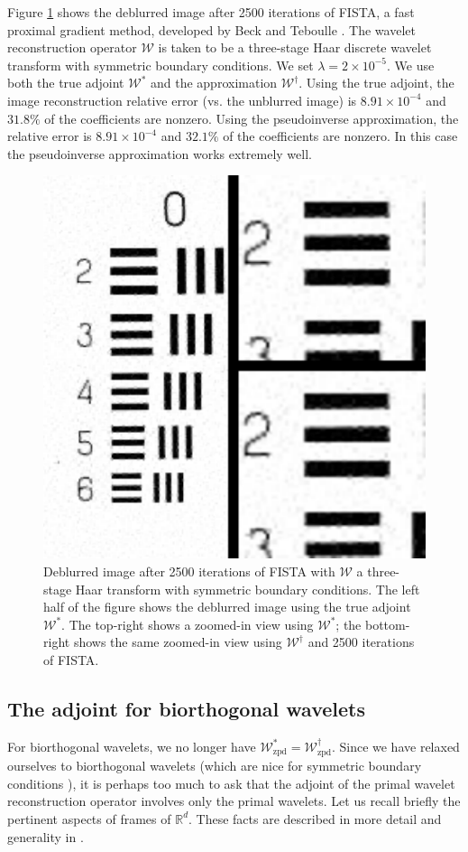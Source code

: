 \documentclass[journal]{IEEEtran}
\newcommand{\reals}{\mathbb{R}}
\begin{document}
Figure \ref{fig:compare_db1_sym} shows the deblurred image after 2500 iterations of FISTA, a fast proximal gradient method, developed by Beck and Teboulle \cite{beck_2009}.  The wavelet reconstruction operator $\mathcal{W}$ is taken to be a three-stage Haar discrete wavelet transform with symmetric boundary conditions.  We set $\lambda=2\times 10^{-5}$.  We use both the true adjoint $\mathcal{W}^\ast$ and the approximation $\mathcal{W}^\dagger$.  Using the true adjoint, the image reconstruction relative error (vs. the unblurred image) is $8.91\times10^{-4}$ and $31.8\%$ of the coefficients are nonzero.  Using the pseudoinverse approximation, the relative error is $8.91\times 10^{-4}$ and $32.1\%$ of the coefficients are nonzero.  In this case the pseudoinverse approximation works extremely well.

\begin{figure}
   \centering
   \includegraphics[width=0.8\columnwidth]{fig2.pdf}
   \caption{Deblurred image after 2500 iterations of FISTA with $\mathcal{W}$ a three-stage Haar transform with symmetric boundary conditions.  The left half of the figure shows the deblurred image using the true adjoint $\mathcal{W}^\ast$.  The top-right shows a zoomed-in view using $\mathcal{W}^\ast$; the bottom-right shows the same zoomed-in view using $\mathcal{W}^\dagger$ and 2500 iterations of FISTA.}
   \label{fig:compare_db1_sym}
\end{figure}


\subsection{The adjoint for biorthogonal wavelets}
For biorthogonal wavelets, we no longer have $\mathcal{W}_\text{zpd}^\ast=\mathcal{W}_\text{zpd}^\dagger$.  Since we have relaxed ourselves to biorthogonal wavelets (which are nice for symmetric boundary conditions \cite{rout_2003}), it is perhaps too much to ask that the adjoint of the primal wavelet reconstruction operator involves only the primal wavelets.  Let us recall briefly the pertinent aspects of frames of $\reals^d$.  These facts are described in more detail and generality in \cite{mallat_2009}.
\end{document}
